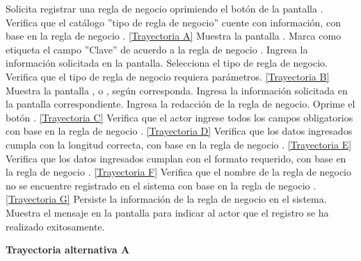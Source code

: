 	\begin{UCtrayectoria}
		\UCpaso[\UCactor] Solicita registrar una regla de negocio oprimiendo el botón  de la pantalla .
		\UCpaso[\UCsist] Verifica que el catálogo ''tipo de regla de negocio'' cuente con información, con base en la regla de negocio . \hyperlink{CU8-1:TAA}{[Trayectoria A]}
		\UCpaso[\UCsist] Muestra la pantalla .
		\UCpaso[\UCsist] Marca como etiqueta el campo ''Clave'' de acuerdo a la regla de negocio .
		\UCpaso[\UCactor] Ingresa la información solicitada en la pantalla. \label{CU8.1-P3}
		\UCpaso[\UCactor] Selecciona el tipo de regla de negocio.
		\UCpaso[\UCsist] Verifica que el tipo de regla de negocio requiera parámetros. \hyperlink{CU8-1:TAB}{[Trayectoria B]}
		\UCpaso[\UCsist] Muestra la pantalla ,  o , según corresponda.
		\UCpaso[\UCactor] Ingresa la información solicitada en la pantalla correspondiente.
		\UCpaso[\UCactor] Ingresa la redacción de la regla de negocio. \label{CU8.1-P9}
		\UCpaso[\UCactor] Oprime el botón . \hyperlink{CU8-1:TAC}{[Trayectoria C]}
		\UCpaso[\UCsist] Verifica que el actor ingrese todos los campos obligatorios con base en la regla de negocio . \hyperlink{CU8-1:TAD}{[Trayectoria D]}
		\UCpaso[\UCsist] Verifica que los datos ingresados cumpla con la longitud correcta, con base en la regla de negocio . \hyperlink{CU8-1:TAE}{[Trayectoria E]}
		\UCpaso[\UCsist] Verifica que los datos ingresados cumplan con el formato requerido, con base en la regla de negocio . \hyperlink{CU8-1:TAF}{[Trayectoria F]}
		\UCpaso[\UCsist] Verifica que el nombre de la regla de negocio no se encuentre registrado en el sistema con base en la regla de negocio . \hyperlink{CU8-1:TAG}{[Trayectoria G]}
		\UCpaso[\UCsist] Persiste la información de la regla de negocio en el sistema.
		\UCpaso[\UCsist] Muestra el mensaje  en la pantalla  para indicar al actor que el registro se ha realizado exitosamente.
	\end{UCtrayectoria}		
\hypertarget{CU8-1:TAA}{\textbf{Trayectoria alternativa A}}\\

